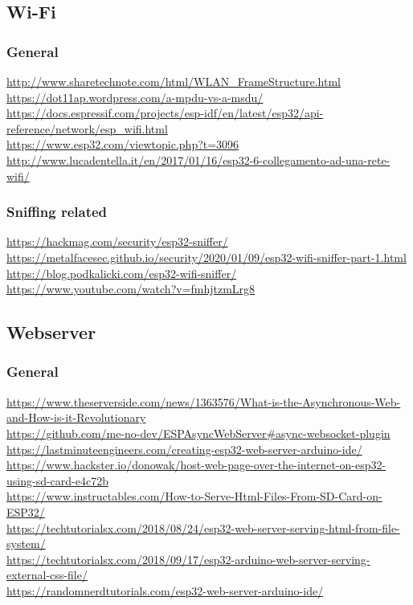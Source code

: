 \documentclass[11pt,a4paper]{article}
\numberwithin{equation}{section}   %
\numberwithin{figure}{section}     %
\numberwithin{table}{section}      %
\begin{document}
\subsection{Wi-Fi}

\subsubsection{General}

\url{http://www.sharetechnote.com/html/WLAN_FrameStructure.html}\\[4pt]
\url{https://dot11ap.wordpress.com/a-mpdu-vs-a-msdu/}\\[4pt]
\url{https://docs.espressif.com/projects/esp-idf/en/latest/esp32/api-reference/network/esp_wifi.html}\\[4pt]
\url{https://www.esp32.com/viewtopic.php?t=3096}\\[4pt]
\url{http://www.lucadentella.it/en/2017/01/16/esp32-6-collegamento-ad-una-rete-wifi/}

\subsubsection{Sniffing related}

\url{https://hackmag.com/security/esp32-sniffer/}\\[4pt]
\url{https://metalfacesec.github.io/security/2020/01/09/esp32-wifi-sniffer-part-1.html}\\[4pt]
\url{https://blog.podkalicki.com/esp32-wifi-sniffer/}\\[4pt]
\url{https://www.youtube.com/watch?v=fmhjtzmLrg8}


\subsection{Webserver}

\subsubsection{General}

\url{https://www.theserverside.com/news/1363576/What-is-the-Asynchronous-Web-and-How-is-it-Revolutionary}\\[4pt]
\url{https://github.com/me-no-dev/ESPAsyncWebServer#async-websocket-plugin}\\[4pt]
\url{https://lastminuteengineers.com/creating-esp32-web-server-arduino-ide/}\\[4pt]
\url{https://www.hackster.io/donowak/host-web-page-over-the-internet-on-esp32-using-sd-card-e4c72b}\\[4pt]
\url{https://www.instructables.com/How-to-Serve-Html-Files-From-SD-Card-on-ESP32/}\\[4pt]
\url{https://techtutorialsx.com/2018/08/24/esp32-web-server-serving-html-from-file-system/}\\[4pt]
\url{https://techtutorialsx.com/2018/09/17/esp32-arduino-web-server-serving-external-css-file/}\\[4pt]
\url{https://randomnerdtutorials.com/esp32-web-server-arduino-ide/}
\end{document}
